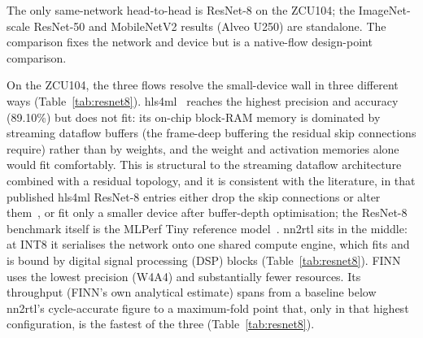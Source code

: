 \documentclass[acmtog,authorversion]{acmart}
\begin{document}
The only same-network head-to-head is ResNet-8 on the ZCU104; the ImageNet-scale ResNet-50 and MobileNetV2 results (Alveo U250) are standalone. The comparison fixes the network and device but is a native-flow design-point comparison.

On the ZCU104, the three flows resolve the small-device wall in three different ways (Table~\ref{tab:resnet8}). hls4ml~\cite{schulte2026hls4ml, duarte2018hls4ml} reaches the highest precision and accuracy (89.10\%) but does not fit: its on-chip block-RAM memory is dominated by streaming dataflow buffers (the frame-deep buffering the residual skip connections require) rather than by weights, and the weight and activation memories alone would fit comfortably. This is structural to the streaming dataflow architecture combined with a residual topology, and it is consistent with the literature, in that published hls4ml ResNet-8 entries either drop the skip connections or alter them~\cite{tailor2023}, or fit only a smaller device after buffer-depth optimisation; the ResNet-8 benchmark itself is the MLPerf Tiny reference model~\cite{banbury2021}. nn2rtl sits in the middle: at INT8 it serialises the network onto one shared compute engine, which fits and is bound by digital signal processing (DSP) blocks (Table~\ref{tab:resnet8}). FINN~\cite{umuroglu2017finn, blott2018finnr} uses the lowest precision (W4A4) and substantially fewer resources. Its throughput (FINN's own analytical estimate) spans from a baseline below nn2rtl's cycle-accurate figure to a maximum-fold point that, only in that highest configuration, is the fastest of the three (Table~\ref{tab:resnet8}).
\end{document}
